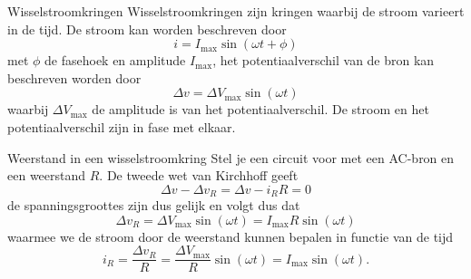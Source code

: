 \begin{theo}[Wisselstroomkringen]{Wisselstroomkringen}
    Wisselstroomkringen zijn kringen waarbij de stroom varieert in de tijd. De stroom kan worden beschreven door
    \begin{equation*}
        i = I_{\max}\sin(\omega t + \phi)
    \end{equation*}
    met $\phi$ de fasehoek en amplitude $I_\text{max}$, het potentiaalverschil van de bron kan beschreven worden door
    \begin{equation*}
        \Delta v = \Delta V_{\max}\sin(\omega t)
    \end{equation*}
    waarbij $\Delta V_{\max}$ de amplitude is van het potentiaalverschil. De stroom en het potentiaalverschil zijn in fase met elkaar.
\end{theo}

\begin{pro}{Weerstand in een wisselstroomkring}
    Stel je een circuit voor met een AC-bron en een weerstand $R$. De tweede wet van Kirchhoff geeft
    \begin{equation*}
        \Delta v - \Delta v_{R} = \Delta v - i_R R = 0
    \end{equation*}
    de spanningsgroottes zijn dus gelijk en volgt dus dat
    \begin{equation*}
        \Delta v_{R} = \Delta V_{\max}\sin(\omega t) = I_{\max}R\sin(\omega t)
    \end{equation*}
    waarmee we de stroom door de weerstand kunnen bepalen in functie van de tijd
    \begin{equation*}
        i_R = \dfrac{\Delta v_{R}}{R} = \dfrac{\Delta V_{\max}}{R}\sin(\omega t) = I_{\max}\sin(\omega t).
    \end{equation*}
    \vspace{-0.5cm}
\end{pro}

\newpage

